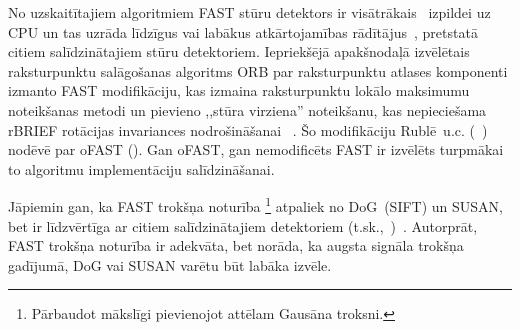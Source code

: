 No uzskaitītajiem algoritmiem FAST stūru detektors ir
visātrākais~\cite{Rosten-tracking}\cite{FAST} izpildei uz CPU un
tas uzrāda līdzīgus vai labākus atkārtojamības rādītājus~\cite{FAST},
pretstatā citiem salīdzinātajiem stūru detektoriem. Iepriekšējā apakšnodaļā
izvēlētais raksturpunktu salāgošanas algoritms ORB par raksturpunktu atlases
komponenti izmanto FAST modifikāciju, kas izmaina raksturpunktu
lokālo maksimumu noteikšanas metodi un pievieno ,,stūra virziena''
noteikšanu, kas nepieciešama rBRIEF rotācijas invariances nodrošināšanai~%
\cite{ORB}. Šo modifikāciju Rublē~u.c.\cite{ORB}
(~) nodēvē par oFAST ().
Gan oFAST, gan nemodificēts FAST ir izvēlēts turpmākai 
to algoritmu implementāciju salīdzināšanai.

Jāpiemin gan, ka FAST trokšņa noturība%
	\footnote{Pārbaudot mākslīgi pievienojot attēlam Gausāna troksni.}
atpaliek no DoG~(SIFT) un SUSAN, bet ir līdzvērtīga ar citiem
salīdzinātajiem detektoriem (t.sk.,~)~\cite{FAST}.
Autorprāt, FAST trokšņa noturība ir adekvāta, bet norāda, ka augsta signāla
trokšņa gadījumā, DoG vai SUSAN varētu būt labāka izvēle.

